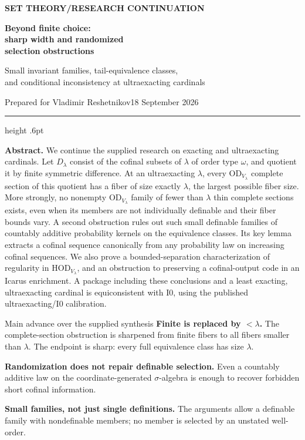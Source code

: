 \documentclass[11pt,letterpaper]{article}
\theoremstyle{definition}
\numberwithin{equation}{section}
\newcommand{\HOD}{\mathrm{HOD}}
\newcommand{\OD}{\mathrm{OD}}
\newcommand{\Izero}{\mathrm{I0}}
\begin{document}
\thispagestyle{empty}
{\sffamily\bfseries\small\color{Olive}SET THEORY\quad /\quad RESEARCH CONTINUATION}
\vspace{13pt}

{\fontsize{28}{31}\selectfont\bfseries\color{Forest}Beyond finite choice:\\ sharp width and randomized\\selection obstructions\par}
\vspace{10pt}
{\fontsize{14}{18}\selectfont Small invariant families, tail-equivalence classes,\\ and conditional inconsistency at ultraexacting cardinals\par}
\vspace{14pt}
{\color{Muted}Prepared for Vladimir Reshetnikov\hfill 18 September 2026\par}
\vspace{3pt}
{\color{Sage}\hrule height .6pt}
\vspace{12pt}

\textbf{Abstract.} We continue the supplied research on exacting and ultraexacting cardinals. Let $D_\lambda$ consist of the cofinal subsets of $\lambda$ of order type $\omega$, and quotient it by finite symmetric difference. At an ultraexacting $\lambda$, every $\OD_{V_\lambda}$ complete section of this quotient has a fiber of size exactly $\lambda$, the largest possible fiber size. More strongly, no nonempty $\OD_{V_\lambda}$ family of fewer than $\lambda$ thin complete sections exists, even when its members are not individually definable and their fiber bounds vary. A second obstruction rules out such small definable families of countably additive probability kernels on the equivalence classes. Its key lemma extracts a cofinal sequence canonically from any probability law on increasing cofinal sequences. We also prove a bounded-separation characterization of regularity in $\HOD_{V_\lambda}$, and an obstruction to preserving a cofinal-output code in an Icarus enrichment. A package including these conclusions and a least exacting, ultraexacting cardinal is equiconsistent with $\Izero$, using the published ultraexacting/$\Izero$ calibration.

\begin{assessment}{Main advance over the supplied synthesis}
\textbf{Finite is replaced by $<\lambda$.} The complete-section obstruction is sharpened from finite fibers to all fibers smaller than $\lambda$. The endpoint is sharp: every full equivalence class has size $\lambda$.

\textbf{Randomization does not repair definable selection.} Even a countably additive law on the coordinate-generated $\sigma$-algebra is enough to recover forbidden short cofinal information.

\textbf{Small families, not just single definitions.} The arguments allow a definable family with nondefinable members; no member is selected by an unstated well-order.
\end{assessment}
\end{document}
